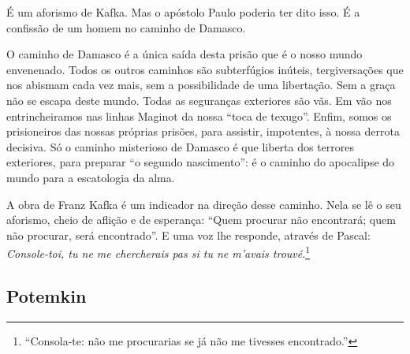 \begin{quote}
\end{quote}

É um aforismo de Kafka.
Mas o apóstolo Paulo poderia ter dito isso. É a confissão de um homem no caminho de Damasco.

O caminho de Damasco é a única saída desta prisão que é o nosso mundo envenenado. Todos os outros caminhos são subterfúgios inúteis, tergiversações que nos abismam cada vez mais, sem a possibilidade de uma libertação.
Sem a graça não se escapa deste mundo. Todas as seguranças exteriores são vãs.
Em vão nos entrincheiramos nas linhas Maginot da nossa ``toca de texugo''.
Enfim, somos os prisioneiros das nossas próprias prisões, para assistir, impotentes, à
nossa derrota decisiva. Só o caminho misterioso de Damasco é que liberta dos terrores exteriores,
para preparar ``o segundo nascimento'': é o caminho do apocalipse do
mundo para a escatologia da alma.

A obra de Franz Kafka é um indicador
na direção desse caminho. Nela se lê o
seu aforismo, cheio de aflição e de esperança: ``Quem procurar não
encontrará; quem não procurar, será encontrado''. E uma voz lhe responde, através de Pascal:
\textit{Console-toi, tu ne me chercherais pas si tu ne m'avais trouvé}.\footnote{``Consola-te: não me procurarias se já não me tivesses encontrado.''}




\subsection{Potemkin}


